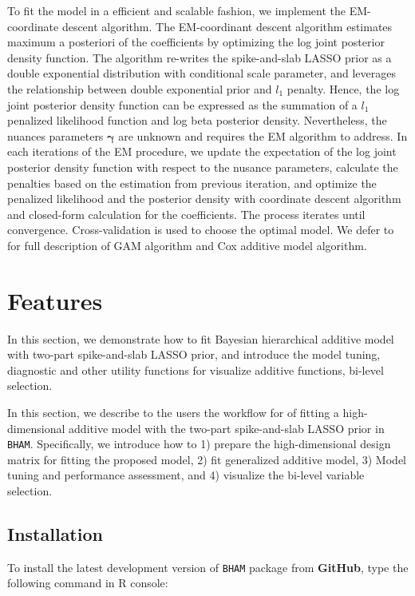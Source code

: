 \documentclass[
]{jss}
\begin{document}
To fit the model in a efficient and scalable fashion, we implement the
EM-coordinate descent algorithm. The EM-coordinant descent algorithm
estimates maximum a posteriori of the coefficients by optimizing the log
joint posterior density function. The algorithm re-writes the
spike-and-slab LASSO prior as a double exponential distribution with
conditional scale parameter, and leverages the relationship between
double exponential prior and \(l_1\) penalty. Hence, the log joint
posterior density function can be expressed as the summation of a
\(l_1\) penalized likelihood function and log beta posterior density.
Nevertheless, the nuances parameters \(\boldsymbol{\gamma}\) are unknown
and requires the EM algorithm to address. In each iterations of the EM
procedure, we update the expectation of the log joint posterior density
function with respect to the nusance parameters, calculate the penalties
based on the estimation from previous iteration, and optimize the
penalized likelihood and the posterior density with coordinate descent
algorithm and closed-form calculation for the coefficients. The process
iterates until convergence. Cross-validation is used to choose the
optimal model. We defer \cite{guo2022, guo2022b}to for full description
of GAM algorithm and Cox additive model algorithm.

\section{Features}

In this section, we demonstrate how to fit Bayesian hierarchical
additive model with two-part spike-and-slab LASSO prior, and introduce
the model tuning, diagnostic and other utility functions for visualize
additive functions, bi-level selection.

In this section, we describe to the users the workflow for of fitting a
high-dimensional additive model with the two-part spike-and-slab LASSO
prior in \texttt{BHAM}. Specifically, we introduce how to 1) prepare the
high-dimensional design matrix for fitting the proposed model, 2) fit
generalized additive model, 3) Model tuning and performance assessment,
and 4) visualize the bi-level variable selection.

\subsection{Installation}

To install the latest development version of \texttt{BHAM} package from
\textbf{GitHub}, type the following command in R console:
\end{document}
